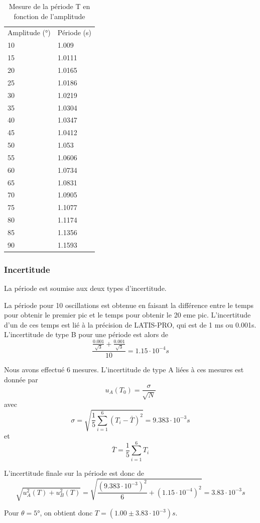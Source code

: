\documentclass[a4paper,10pt,french]{scrartcl}
\begin{document}
\begin{table}[H]
\begin{center}
\begin{tabular}{ll}
Amplitude (°) & Période (s)\\
10 & 1.009\\
15 & 1.0111\\
20 & 1.0165\\
25 & 1.0186\\
30 & 1.0219\\
35 & 1.0304\\
40&1.0347\\
45&1.0412\\
50&1.053\\
55&1.0606\\
60&1.0734\\
65&1.0831\\
70&1.0905\\
75&1.1077\\
80&1.1174\\
85&1.1356\\
90&1.1593
\end{tabular}
\end{center}
\caption{Mesure de la période T en fonction de l'amplitude}
\end{table}
\subsubsection{Incertitude}
La période est soumise aux deux types d'incertitude.

La période pour 10 oscillations est obtenue en faisant la différence entre le temps pour obtenir le premier pic et le temps pour obtenir le 20 eme pic. L'incertitude d'un de ces temps est lié à la précision de LATIS-PRO, qui est de 1 ms ou 0.001s. L'incertitude de type B pour une période est alors de \[\frac{\frac{0.001}{\sqrt{3}} + \frac{0.001}{\sqrt{3}}}{10} = 1.15\cdot 10^{-4} s\]

Nous avons effectué  6 mesures. L'incertitude de type A liées à ces mesures est donnée par \[u_A(T_0) = \frac{\sigma}{\sqrt{N}}\] avec \[\sigma = \sqrt{\frac{1}{5}\sum^{6}_{i=1}(T_i-\bar{T})^2} = 9.383\cdot10^{-3} s\] et \[\bar{T} = \frac{1}{5}\sum^6_{i=1} T_i\]

L'incertitude finale sur la période est donc de  \[\sqrt{u^2_A(T)+u^2_B(T)} = \sqrt{\frac{(9.383\cdot10^{-3})^2}{6} + (1.15\cdot 10^{-4})^2 } = 3.83\cdot 10^{-3} s\]

Pour \(\theta = 5°\), on obtient donc \(T = (1.00\pm 3.83\cdot 10^{-3})s\).
\end{document}
